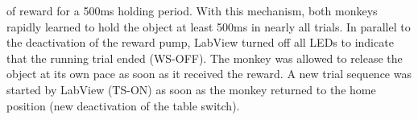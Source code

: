 {of reward for a 500ms holding period. With this mechanism, both monkeys rapidly learned to hold the object at least 500ms in nearly all trials. In parallel to the deactivation of the reward pump, LabView turned off all LEDs to indicate that the running trial ended (WS-OFF). The monkey was allowed to release the object at its own pace as soon as it received the reward. A new trial sequence was started by LabView (TS-ON) as soon as the monkey returned to the home position (new deactivation of the table switch).
% 
% 
% 
% 
}
